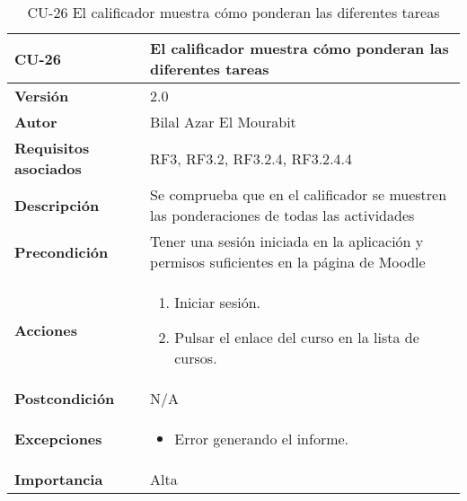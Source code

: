 \begin{table}[H]
	\centering
	\begin{tabularx}{\linewidth}{ p{} p{} }
		\toprule
		\textbf{CU-26}    & \textbf{El calificador muestra cómo ponderan las diferentes tareas}\\
		\toprule
		\textbf{Versión}              & 2.0    \\
		\textbf{Autor}                & Bilal Azar El Mourabit \\
		\textbf{Requisitos asociados} & RF3, RF3.2, RF3.2.4, RF3.2.4.4 \\
		\textbf{Descripción}          & Se comprueba que en el calificador se muestren las ponderaciones de todas las actividades\\
    		\textbf{Precondición}         & Tener una sesión iniciada en la aplicación y permisos suficientes en la página de Moodle\\
		\textbf{Acciones}             & 
		\begin{enumerate}
			\def\labelenumi{\arabic{enumi}.}
			\tightlist
			\item Iniciar sesión.
            \item Pulsar el enlace del curso en la lista de cursos. 
		\end{enumerate}\\
		\textbf{Postcondición}        & N/A \\
		\textbf{Excepciones}          & \begin{itemize}
		    \item Error generando el informe.
		\end{itemize} \\
		\textbf{Importancia}          & Alta \\
		\bottomrule
	\end{tabularx}
	\caption{CU-26 El calificador muestra cómo ponderan las diferentes tareas}
\end{table}

